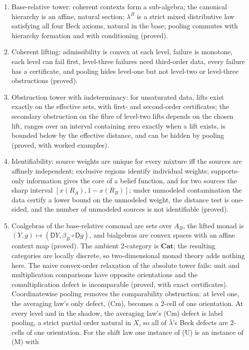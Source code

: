 \documentclass[11pt]{article}
\theoremstyle{definition}
\theoremstyle{remark}
\newcommand{\D}{\mathsf{D}}
\newcommand{\lb}{\bar\lambda}
\begin{document}
\begin{enumerate}[leftmargin=*]
\item Base-relative tower: coherent contexts form a sub-algebra; the canonical hierarchy is an
  affine, natural section; $\lambda^B$ is a strict mixed distributive law satisfying all four Beck
  axioms, natural in the base; pooling commutes with hierarchy formation and with conditioning
  (proved).
\item Coherent lifting: admissibility is convex at each level, failure is monotone, each level can
  fail first, level-three failures need third-order data, every failure has a certificate, and pooling
  hides level-one but not level-two or level-three obstructions (proved).
\item Obstruction tower with indeterminacy: for unsaturated data, lifts exist exactly on the effective
  sets, with first- and second-order certificates; the secondary obstruction on the fibre of level-two
  lifts depends on the chosen lift, ranges over an interval containing zero exactly when a lift exists,
  is bounded below by the effective distance, and can be hidden by pooling (proved, with worked
  examples).
\item Identifiability: source weights are unique for every mixture iff the sources are affinely
  independent; exclusive regions identify individual weights; supports-only information gives the
  core of a belief function, and for two sources the sharp interval $[x(R_A),1-x(R_B)]$; under
  unmodeled contamination the data certify a lower bound on the unmodeled weight, the distance test
  is one-sided, and the number of unmodeled sources is not identifiable (proved).
\item Coalgebras of the base-relative comonad are sets over $A_B$, the lifted monad is
  $(Y,g)\mapsto(\D Y,\beta_B\circ\D g)$, and bialgebras are convex spaces with an affine context map
  (proved). The ambient 2-category is $\mathbf{Cat}$; the resulting categories are locally discrete,
  so two-dimensional monad theory adds nothing here. The naive convex-order relaxation of the
  absolute tower fails: unit and multiplication comparisons have opposite orientations and the
  comultiplication defect is incomparable (proved, with exact certificates).
  Coordinatewise pooling removes the comparability obstruction: at level one, the averaging law's only defect, (Cm), becomes a 2-cell of one
  orientation. At every level and in the shadow, the averaging law's (Cm) defect is label pooling, a strict partial order natural in
  $X$, so all of $\lb$'s Beck defects are 2-cells of one orientation. For the shift law one instance of (U) is an instance of (M) with

\end{enumerate}
\end{document}
